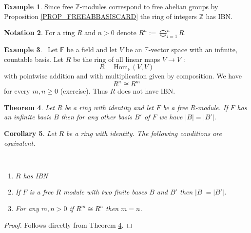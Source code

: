 \documentclass[12pt, letterpaper, oneside]{article}
\theoremstyle{plain}
\newtheorem{theorem}{Theorem}[section]
\newtheorem{corollary}[theorem]{Corollary}
\theoremstyle{definition}
\newtheorem{example}[theorem]{Example}
\newtheorem{notation}[theorem]{Notation}
\newcommand{\Z}{{\mathbb Z}}
\newcommand{\F}{{\mathbb F}}
\newcommand{\Hom}{\mathrm{Hom}}
\newcommand{\benu}{\begin{enumerate}}
\newcommand{\eenu}{\end{enumerate}}
\newcommand{\vs}{\vskip 5mm}
\begin{document}
 \vs\vs 
 
 \begin{example} 
Since free $\Z$-modules correspond to free abelian groups by 
Proposition \ref{PROP_FREEABBASISCARD} the ring of integers $\Z$ has  IBN. 
\end{example} 


\vs\vs


\begin{notation}
For a ring $R$ and $n> 0$ denote $R^{n} := \bigoplus_{i=1}^{n} R $.
\end{notation}


\vs\vs

\begin{example}\ 
Let $\F$ be a field and let $V$ be an $\F$-vector space with an infinite, countable basis. 
Let $R$ be the ring of all linear maps $V\to V$ :
$$R = \Hom_{\F}(V, V)$$ 
with pointwise addition and with multiplication given by 
composition. We have 
$$R^{n} \cong R^{m}$$
for every $m, n \geq 0$ (exercise). Thus $R$ does not have  IBN.
\end{example} 
 

\vs\vs 

\begin{theorem}
\label{THM_INFNITEBASISINV}
Let $R$ be a ring with identity and let $F$ be a free $R$-module. If $F$ has an infinite basis $B$
then for any other basis  $B'$ of $F$ we have $|B| = |B'|$.
\end{theorem}


\vs\vs


\begin{corollary}
\label{COR_IBNFINITEBASES}
Let $R$ be a ring with identity. The following conditions are equivalent. 

\vskip -13mm

\ 
\benu
\item $R$ has  IBN
\item If $F$ is a free $R$ module with two finite bases $B$ and $B'$ then $|B| = |B'|$.
\item For any $m, n>0$ if $R^{m} \cong  R^{n}$ then $m=n$.
\eenu 
\end{corollary}


\vs

\begin{proof}
Follows directly from Theorem \ref{THM_INFNITEBASISINV}. 
\end{proof}


\vs\vs
\end{document}
